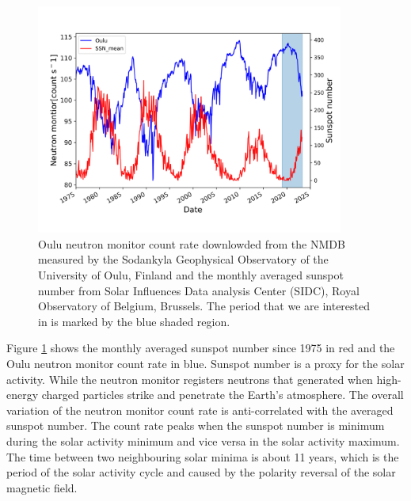 \begin{figure}[!htb]
	\centering
	\includegraphics[width = 0.9\textwidth]{images/Solar_modulation.png}
	\caption[Sunspot number and Neutron monitor count data]{Oulu neutron monitor count rate downlowded from the \ac{NMDB} measured by the Sodankyla Geophysical Observatory of the University of Oulu, Finland and the monthly averaged sunspot number from Solar Influences Data analysis Center (SIDC), Royal Observatory of Belgium, Brussels. The period that we are interested in is marked by the blue shaded region.}
	\label{Fig:Solar_modulation}
\end{figure}


Figure \ref{Fig:Solar_modulation} shows the monthly averaged sunspot number since 1975 in red and the Oulu neutron monitor count rate in blue.
Sunspot number is a proxy for the solar activity. While the neutron monitor registers neutrons that generated when high-energy charged particles strike and penetrate the Earth's atmosphere. The overall variation of the neutron monitor count rate is anti-correlated with the averaged sunspot number.
The count rate peaks when the sunspot number is minimum during the solar activity minimum and vice versa in the solar activity maximum. The time between two neighbouring solar minima is about 11 years, which is the period of the solar activity cycle and caused by the polarity reversal of the solar magnetic field.

